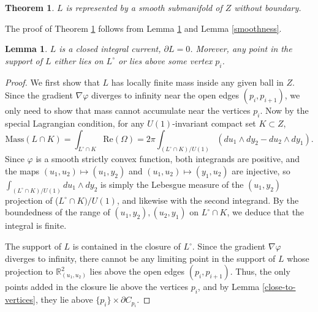 \documentclass[11pt]{article}
\newtheorem{theorem}{Theorem}
\newtheorem{lemma}{Lemma}
\begin{document}
\begin{theorem}\label{smooth-submanifold}
    $L$ is represented by a smooth submanifold of $Z$ without boundary.
\end{theorem}


The proof of Theorem \ref{smooth-submanifold} follows from Lemma \ref{no-boundary} and Lemma \ref{smoothness}.

\begin{lemma}\label{no-boundary}
    $L$ is a closed integral current,  $\partial L = 0$. Morever, any point in the support of $L$ either lies on $L^\circ$ or lies above some vertex $p_i$.
\end{lemma}

\begin{proof}
We first show that $L$ has locally finite mass inside any given ball in $Z$. Since the gradient $\nabla \varphi$ diverges to infinity near the open edges $(p_i,p_{i+1})$, we only need to show that mass cannot accumulate near the vertices $p_i$. Now by the special Lagrangian condition, for any $U(1)$-invariant compact set $K\subset Z$,
\[
\text{Mass}(L\cap K) =\int_{L^\circ\cap K} \text{Re}(\Omega) =2\pi\int_{(L^\circ \cap K)/U(1)} (du_1\wedge dy_2-du_2\wedge dy_1).
\]
Since $\varphi$ is a smooth strictly convex function, both integrands are positive, and the maps $(u_1, u_2)\mapsto (u_1, y_2)$ and $(u_1, u_2)\mapsto (y_1, u_2)$ are injective, so $\int_{(L^\circ \cap K)/U(1)} du_1\wedge dy_2$ is simply the Lebesgue measure of the $(u_1,y_2)$ projection of ($L^\circ \cap K)/U(1)$, and likewise with the second integrand. 
By the boundedness of the range of $(u_1, y_2), (u_2,y_1)$ on $L^\circ \cap K$, we deduce that the integral is finite.  








The support of $L$ is contained in the closure of $L^\circ$.
Since the gradient $\nabla \varphi$ diverges to infinity, there cannot be any limiting point in the support of $L$ whose projection to $\mathbb{R}^2_{(u_1,u_2)}$ lies above the open edges $(p_i,p_{i+1})$. Thus, the only points added in the closure lie above the vertices $p_i$, and by Lemma \ref{close-to-vertices}, they lie above $\{p_i\}\times \partial C_{p_i}$.   




\end{proof}
\end{document}
